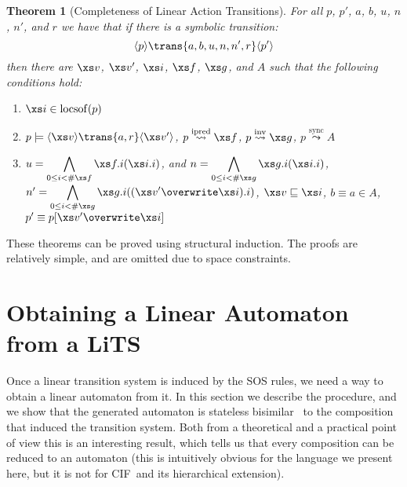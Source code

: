 \documentclass[submission,copyright,creativecommons,sharealike]{eptcs}
\newcommand{\CIF}{{CIF}}
\newcommand{\sstate}[1]{\ensuremath{\langle #1 \rangle}}
\newcommand{\satrans}[1]{\ensuremath{\trans{#1}}}
\newcommand{\saof}[0]{
\ensuremath{\stackrel {\mathrm{sync}} {\leadsto}}
}
\newcommand{\ipredof}[0]{
\ensuremath{\stackrel {\mathrm{ipred}} {\leadsto}}
}
\newcommand{\invof}[0]{
\ensuremath{\stackrel {\mathrm{inv}} {\leadsto}}
}
\newtheorem{theorem}{Theorem}
\begin{document}
\begin{theorem}[Completeness of Linear Action Transitions]
  For all $p$, $p'$, $a$, $b$, $u$, $n$, $n'$, and $r$ we have that if
  there is a symbolic transition:
  \begin{equation*}
    \sstate{p} \satrans{a, b, u, n, n', r} \sstate{p'}
  \end{equation*}
  then there are $\xs v$, $\xs v'$, $\xs i$, $\xs f$, $\xs g$, and $A$
  such that the following conditions hold:
  \begin{enumerate}
  \item $\xs i \in \mathrm{locsof}(p)$
  \item $p \models \sstate{\xs v} \trans{a,r} \sstate{\xs v'}$, $p
    \ipredof \xs f$, $p \invof \xs g$, $p \saof A$
  \item $u = \displaystyle \bigwedge_{0 \leq i < \#\xs f} \xs f{.}i
    (\xs i{.}i)$, and $n = \displaystyle \bigwedge_{0 \leq i < \# \xs
      g} \xs g {.} i (\xs i {.} i)$, $n' =
    \displaystyle \bigwedge_{0 \leq i < \# \xs g} \xs g{.}i ((\xs v'
    \overwrite \xs i){.}i)$, $\xs v \sqsubseteq \xs i$, $b \equiv a
  \in A$, $p' \equiv p[\xs v' \overwrite \xs i]$
  \end{enumerate}
\end{theorem}

These theorems can be proved using structural induction.
  The proofs are relatively simple, and are omitted due to space
  constraints.




\section{Obtaining a Linear Automaton from a LiTS}
\label{sec:obta-line-autom}

Once a linear transition system is induced by the SOS rules, we need a
way to obtain a linear automaton from it. In this section we describe
the procedure, and we show that the generated automaton is stateless
bisimilar~\cite{MousaviRenGro:CongrSOSdataArtInfComp05} to the composition that induced the transition system. Both
from a theoretical and a practical point of view this is an
interesting result, which tells us that every composition can be
reduced to an automaton (this is intuitively obvious for the language
we present here, but it is not for \CIF\ and its hierarchical
extension).
\end{document}
